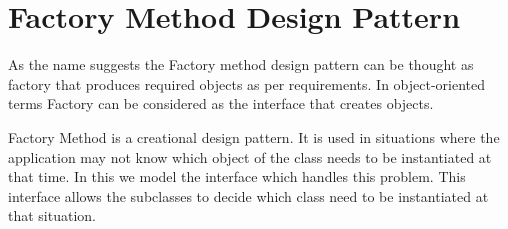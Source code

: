 \section{Factory Method Design Pattern}
As the name suggests the Factory method design pattern can be thought as factory that produces required objects as per requirements. In object-oriented terms Factory can be considered as the interface that creates objects. 

Factory Method is a creational design pattern. It is used in situations where the application may not know which object of the class needs to be instantiated at that time. In this we model the interface which handles this problem. This interface allows the subclasses to decide which class need to be instantiated at that situation.